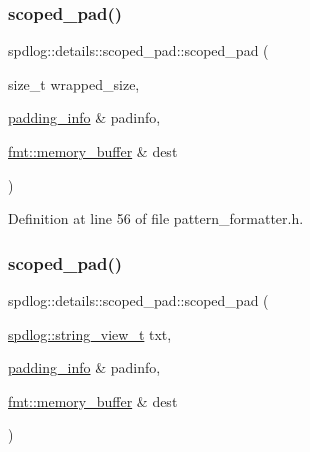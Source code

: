 \subsubsection{\texorpdfstring{scoped\+\_\+pad()}{scoped\_pad()}\hspace{0.1cm}{\footnotesize\ttfamily [1/2]}}
{\footnotesize\ttfamily spdlog\+::details\+::scoped\+\_\+pad\+::scoped\+\_\+pad (\begin{DoxyParamCaption}\item[{size\+\_\+t}]{wrapped\+\_\+size,  }\item[{\hyperlink{structspdlog_1_1details_1_1padding__info}{padding\+\_\+info} \&}]{padinfo,  }\item[{\hyperlink{format_8h_a21cbf729f69302f578e6db21c5e9e0d2}{fmt\+::memory\+\_\+buffer} \&}]{dest }\end{DoxyParamCaption})\hspace{0.3cm}{\ttfamily [inline]}}



Definition at line 56 of file pattern\+\_\+formatter.\+h.

\mbox{\label{classspdlog_1_1details_1_1scoped__pad_a945477b9e2c1ee236238bb63129a767d}} 
\subsubsection{\texorpdfstring{scoped\+\_\+pad()}{scoped\_pad()}\hspace{0.1cm}{\footnotesize\ttfamily [2/2]}}
{\footnotesize\ttfamily spdlog\+::details\+::scoped\+\_\+pad\+::scoped\+\_\+pad (\begin{DoxyParamCaption}\item[{\hyperlink{namespacespdlog_af48e310b2f366ac6544701e6a3b56247}{spdlog\+::string\+\_\+view\+\_\+t}}]{txt,  }\item[{\hyperlink{structspdlog_1_1details_1_1padding__info}{padding\+\_\+info} \&}]{padinfo,  }\item[{\hyperlink{format_8h_a21cbf729f69302f578e6db21c5e9e0d2}{fmt\+::memory\+\_\+buffer} \&}]{dest }\end{DoxyParamCaption})\hspace{0.3cm}{\ttfamily [inline]}}



